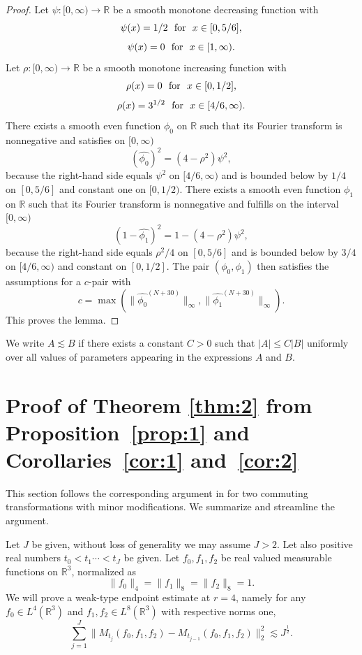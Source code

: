 \documentclass[12pt,reqno]{amsart}
\theoremstyle{plain}
\theoremstyle{definition}
\numberwithin{equation}{section}
\newcommand{\R}{{\mathbb R}}
\def\wh{\widehat}
\begin{document}
\begin{proof} 

Let $\psi :[0,\infty) \to \R$ be a smooth monotone decreasing function  with
\[\psi(x)=1/2 \ \ {\rm for}\ \  x\in [0, 5/6],\] 
\[\psi(x)=0 \ \ {\rm for}\ \  x\in [1, \infty).\]
Let $\rho:[0,\infty) \to \R$ be a smooth monotone increasing function with
\[\rho(x)=0 \ \ {\rm for}\ \  x\in [0, 1/2],\] 
\[\rho(x)=3^{1/2} \ \ {\rm for}\ \  x\in [4/6, \infty).\]
There exists a smooth even function $\phi_0$ on $\R$
such that its Fourier transform is nonnegative and satisfies on $[0,\infty)$
\begin{equation*}%
(\wh{\phi_0})^2= (4-\rho^2)\psi^2,\end{equation*}
because the right-hand side equals $\psi^2$ on $[4/6,\infty)$
and is bounded below by $1/4$ on $[0,5/6]$ and constant one 
on $[0,1/2)$.
There exists a smooth even function $\phi_1$ on $\R$ such that its Fourier transform is nonnegative and fulfills on the interval $[0,\infty)$
\begin{equation*}%
(1-\wh{\phi_1})^2=1-(4 -\rho^2)\psi^2,\end{equation*}
because the right-hand side equals $\rho^2/4$ on $[0,5/6]$
and is bounded below by $3/4$ on $[4/6,\infty)$ and constant
on $[0,1/2]$.
The pair $(\phi_0,\phi_1)$ then satisfies the assumptions 
for a $c$-pair with
$$c=\max(\|{\wh{\phi_0}}^{(N+30)}\|_\infty,  \|{\wh{\phi_1}}^{(N+30)}\|_\infty).$$
This proves the lemma.
\end{proof}


We write $A\lesssim B$ if there exists a constant $C>0$ such that
$|A|\le C|B|$ uniformly over all values of parameters appearing in the expressions $A$ and $B$.
 

 

\section{Proof of Theorem \ref{thm:2} from Proposition~\ref{prop:1} and Corollaries~\ref{cor:1} and~\ref{cor:2}}
\label{proofthm:2}



This section follows the corresponding argument in \cite{MR3904183} for two commuting transformations
with minor modifications.
We summarize and streamline the argument.


Let $J$ be given, without loss of generality we may assume $J>2$. Let also positive real numbers $t_0<t_1\cdots < t_J$ be given.  
Let  $f_0,f_1,f_2$ be real valued measurable functions on $\R^3$, normalized as 
\[\|f_0\|_{4} =  \|f_1\|_{8}=\|f_2\|_{8}=1. \]
We will prove a weak-type  endpoint estimate at $r=4$, namely
for any $f_0\in L^4(\R^3)$  and $f_1,f_2\in {L}^8(\mathbb{R}^3)$ with respective norms one,
\begin{equation}\label{eq:doublenormvar}
\sum_{j=1}^{J} \|M_{t_j}(f_0,f_1,f_2) - M_{t_{j-1}}(f_0,f_1,f_2)\|_{2}^2 \lesssim J^{\frac 12}.
\end{equation}
\end{document}
